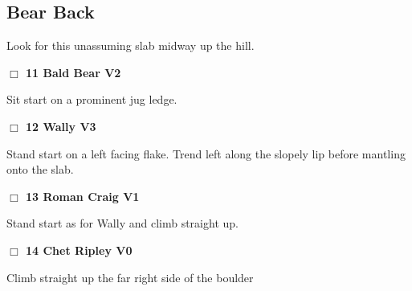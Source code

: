 	\begin{multicols}{2}

\needspace{10em}
\subsection*{Bear Back}\label{bf:Bear Back}

Look for this unassuming slab midway up the hill.\\



\needspace{2em}
\label{rt:Bald Bear}
\colorbox{green!20}{
\parbox{0.95\linewidth}{
\hspace{-1ex}\textbf{$\Box$
11 Bald Bear V2  
}}}
\begin{adjustwidth}{1.3em}{}			

Sit start on a prominent jug ledge.
\end{adjustwidth}




\needspace{2em}
\label{rt:Wally}
\colorbox{green!20}{
\parbox{0.95\linewidth}{
\hspace{-1ex}\textbf{$\Box$
12 Wally V3  \warn
}}}
\begin{adjustwidth}{1.3em}{}			

Stand start on a left facing flake. Trend left along the slopely lip before mantling onto the slab.
\end{adjustwidth}




\needspace{2em}
\label{rt:Roman Craig}
\colorbox{green!20}{
\parbox{0.95\linewidth}{
\hspace{-1ex}\textbf{$\Box$
13 Roman Craig V1  \warn
}}}
\begin{adjustwidth}{1.3em}{}			

Stand start as for Wally and climb straight up.
\end{adjustwidth}




\needspace{2em}
\label{rt:Chet Ripley}
\colorbox{green!20}{
\parbox{0.95\linewidth}{
\hspace{-1ex}\textbf{$\Box$
14 Chet Ripley V0  \warn
}}}
\begin{adjustwidth}{1.3em}{}			

Climb straight up the far right side of the boulder
\end{adjustwidth}





\end{multicols}
